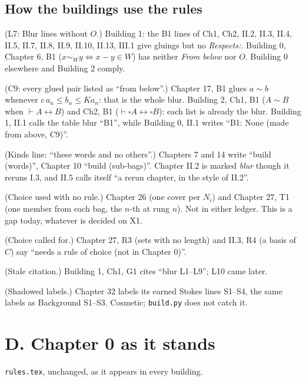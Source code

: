 \subsection*{How the buildings use the rules}
\begin{lines}
\item[\lab{10}] (L7: Blur lines without $O$.) Building 1: the B1 lines of Ch1, Ch2, II.2, II.3, II.4, II.5, II.7, II.8, II.9, II.10, II.13, III.1 give gluings but no \emph{Respects:}. Building 0, Chapter 6, B1 ($x \sim_W y \iff x - y \in W$) has neither \emph{From below} nor $O$. Building 0 elsewhere and Building 2 comply.
\item[\lab{11}] (C9: every glued pair listed as ``from below''.) Chapter 17, B1 glues $a \sim b$ whenever $c\,a_n \le b_n \le K a_n$: that is the whole blur. Building 2, Ch1, B1 ($A \sim B$ when $\vdash A \leftrightarrow B$) and Ch2, B1 ($\vdash \square A \leftrightarrow \square B$): each list is already the blur. Building 1, II.1 calls the table blur ``B1'', while Building 0, II.1 writes ``B1: None (made from above, C9)''.
\item[\lab{12}] (Kinds line: ``these words and no others''.) Chapters 7 and 14 write ``build (words)'', Chapter 10 ``build (sub-bags)''. Chapter II.2 is marked \emph{blur} though it reruns I.3, and II.5 calls itself ``a rerun chapter, in the style of II.2''.
\item[\lab{13}] (Choice used with no rule.) Chapter 26 (one cover per $N_i$) and Chapter 27, T1 (one member from each bag, the $n$-th at rung $n$). Not in either ledger. This is a gap today, whatever is decided on X1.
\item[\lab{14}] (Choice called for.) Chapter 27, R3 (sets with no length) and II.3, R4 (a basis of $C$) say ``needs a rule of choice (not in Chapter 0)''.
\item[\lab{15}] (Stale citation.) Building 1, Ch1, G1 cites ``blur L1--L9''; L10 came later.
\item[\lab{16}] (Shadowed labels.) Chapter 32 labels its earned Stokes lines S1--S4, the same labels as Background S1--S3. Cosmetic; \texttt{build.py} does not catch it.
\end{lines}

\section*{D. Chapter 0 as it stands}
{\small \texttt{rules.tex}, unchanged, as it appears in every building.}
\let\oldsection\section
\renewcommand{\section}{\subsection}



